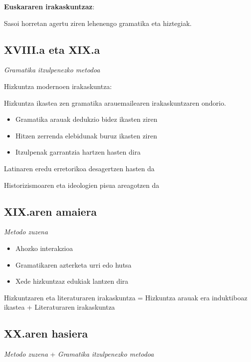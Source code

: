 \documentclass[
]{book}
\providecommand{\tightlist}{%
  \setlength{\itemsep}{0pt}\setlength{\parskip}{0pt}}
\begin{document}
\textbf{Euskararen irakaskuntzaz}:

Sasoi horretan agertu ziren lehenengo gramatika eta hiztegiak.

\hypertarget{xviii.a-eta-xix.a}{%
\subsection{XVIII.a eta XIX.a}\label{xviii.a-eta-xix.a}}

\emph{Gramatika itzulpenezko metodoa}

Hizkuntza modernoen irakaskuntza:

Hizkuntza ikastea zen gramatika arauemailearen irakaskuntzaren ondorio.

\begin{itemize}
\tightlist
\item
  Gramatika arauak dedukzio bidez ikasten ziren
\item
  Hitzen zerrenda elebidunak buruz ikasten ziren
\item
  Itzulpenak garrantzia hartzen hasten dira
\end{itemize}

Latinaren eredu erretorikoa desagertzen hasten da

Historizismoaren eta ideologien pisua areagotzen da

\hypertarget{xix.aren-amaiera}{%
\subsection{XIX.aren amaiera}\label{xix.aren-amaiera}}

\emph{Metodo zuzena}

\begin{itemize}
\tightlist
\item
  Ahozko interakzioa
\item
  Gramatikaren azterketa urri edo hutsa
\item
  Xede hizkuntzaz edukiak lantzen dira
\end{itemize}

Hizkuntzaren eta literaturaren irakaskuntza = Hizkuntza arauak era induktiboaz ikastea + Literaturaren irakaskuntza

\hypertarget{xx.aren-hasiera}{%
\subsection{XX.aren hasiera}\label{xx.aren-hasiera}}

\emph{Metodo zuzena} + \emph{Gramatika itzulpenezko metodoa}
\end{document}
